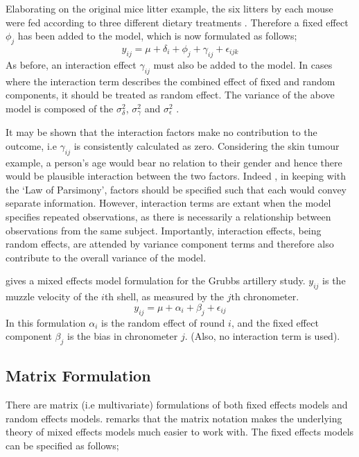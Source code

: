\documentclass[12pt, a4paper]{report}
\theoremstyle{plain}
\theoremstyle{definition}
\theoremstyle{remark}
\begin{document}
Elaborating on the original mice litter example, the six litters
by each mouse were fed according to three different dietary
treatments \citep{Searle}. Therefore a fixed effect $\phi_{j}$ has
been added to the model, which is now formulated as follows;
\begin{equation}
y_{ij} = \mu + \delta_{i} + \phi_{j} + \gamma_{ij} +
\epsilon_{ijk}
\end{equation}
As before, an interaction effect $\gamma_{ij}$ must also be added
to the model. In cases where the interaction term describes the
combined effect of fixed and random components, it should be
treated as random effect. The variance of the above model is
composed of the $\sigma^{2}_{\delta}$, $\sigma^{2}_{\gamma}$ and
$\sigma^{2}_{\epsilon}$ .


It may be shown that the interaction factors make no contribution
to the outcome, i.e $\gamma_{ij}$ is consistently calculated as
zero. Considering the skin tumour example, a person's age would
bear no relation to their gender and hence there would be
plausible interaction between the two factors. Indeed , in keeping
with the `Law of Parsimony', factors should be specified such that
each would convey separate information. However, interaction terms
are extant when the model specifies repeated observations, as
there is necessarily a relationship between observations from the
same subject. Importantly, interaction effects, being random
effects, are attended by variance component terms and therefore
also contribute to the overall variance of the model.

\citet{Searle} gives a mixed effects model formulation for the
Grubbs artillery study. $y_{ij}$ is the muzzle velocity of the
$i$th shell, as measured by the $j$th chronometer.
\begin{equation}
y_{ij} = \mu + \alpha_{i} + \beta_{j}  + \epsilon_{ij}
\end{equation}
In this formulation $\alpha_{i}$ is the random effect of round
$i$, and the fixed effect component $\beta_{j}$ is the bias in
chronometer $j$. (Also, no interaction term is used).


\subsection{Matrix Formulation} There are matrix (i.e multivariate)
formulations of both fixed effects models and random effects
models. \citet{BrownPrescott} remarks that the matrix notation
makes the underlying theory of mixed effects models much easier to
work with. The fixed effects models can be specified as follows;
\end{document}
